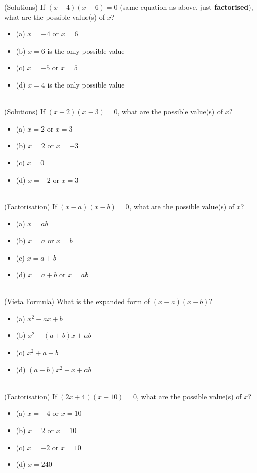 \documentclass{article}
\begin{document}
(Solutions) If $(x+4)(x-6) = 0$ (same equation as above, just \textbf{factorised}), what are the possible value(s) of $x$?
\begin{itemize}
\item[](a) $x=-4$ or $x=6$
\item[](b) $x=6$ is the only possible value
\item[](c) $x=-5$ or $x=5$
\item[](d) $x=4$ is the only possible value
\end{itemize}\hrulefill \\[10pt]
(Solutions) If $(x+2)(x-3) = 0$, what are the possible value(s) of $x$?
\begin{itemize}
\item[](a) $x=2$ or $x=3$ 
\item[](b) $x=2$ or $x=-3$
\item[](c) $x=0$
\item[](d) $x=-2$ or $x=3$
\end{itemize}\hrulefill \\[10pt]
(Factorisation) If $(x-a)(x-b) = 0$, what are the possible value(s) of $x$?
\begin{itemize}
\item[](a) $x=ab$
\item[](b) $x=a$ or $x=b$
\item[](c) $x=a+b$
\item[](d) $x=a+b$ or $x=ab$
\end{itemize}\hrulefill \\[10pt]
\clearpage
\noindent (Vieta Formula) What is the expanded form of $(x-a)(x-b)$?
\begin{itemize}
\item[](a) $x^2 - ax + b$
\item[](b) $x^2 - (a+b)x + ab$
\item[](c) $x^2 + a + b$
\item[](d) $(a+b)x^2 + x + ab$
\end{itemize}\hrulefill \\[10pt]
(Factorisation) If $(2x+4)(x-10) = 0$, what are the possible value(s) of $x$?
\begin{itemize}
\item[](a) $x=-4$ or $x=10$
\item[](b) $x=2$ or $x=10$
\item[](c) $x=-2$ or $x=10$
\item[](d) $x=240$
\end{itemize}\hrulefill \\[10pt]
\end{document}
